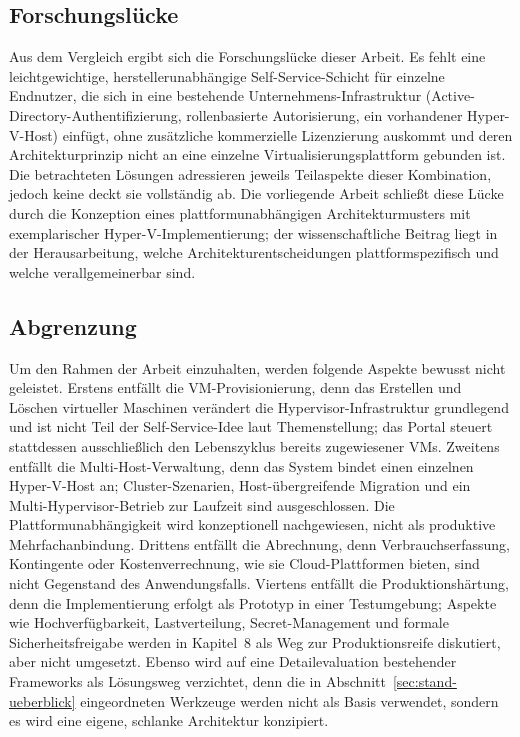 \documentclass[12pt,a4paper]{article}
\begin{document}
\subsection{Forschungslücke}

Aus dem Vergleich ergibt sich die Forschungslücke dieser Arbeit. Es fehlt eine leichtgewichtige, herstellerunabhängige Self-Service-Schicht für einzelne Endnutzer, die sich in eine bestehende Unternehmens-Infrastruktur (Active-Directory-Authentifizierung, rollenbasierte Autorisierung, ein vorhandener Hyper-V-Host) einfügt, ohne zusätzliche kommerzielle Lizenzierung auskommt und deren Architekturprinzip nicht an eine einzelne Virtualisierungsplattform gebunden ist. Die betrachteten Lösungen adressieren jeweils Teilaspekte dieser Kombination, jedoch keine deckt sie vollständig ab. Die vorliegende Arbeit schließt diese Lücke durch die Konzeption eines plattformunabhängigen Architekturmusters mit exemplarischer Hyper-V-Implementierung; der wissenschaftliche Beitrag liegt in der Herausarbeitung, welche Architekturentscheidungen plattformspezifisch und welche verallgemeinerbar sind.

\subsection{Abgrenzung}

Um den Rahmen der Arbeit einzuhalten, werden folgende Aspekte bewusst nicht geleistet. Erstens entfällt die VM-Provisionierung, denn das Erstellen und Löschen virtueller Maschinen verändert die Hypervisor-Infrastruktur grundlegend und ist nicht Teil der Self-Service-Idee laut Themenstellung; das Portal steuert stattdessen ausschließlich den Lebenszyklus bereits zugewiesener VMs. Zweitens entfällt die Multi-Host-Verwaltung, denn das System bindet einen einzelnen Hyper-V-Host an; Cluster-Szenarien, Host-übergreifende Migration und ein Multi-Hypervisor-Betrieb zur Laufzeit sind ausgeschlossen. Die Plattformunabhängigkeit wird konzeptionell nachgewiesen, nicht als produktive Mehrfachanbindung. Drittens entfällt die Abrechnung, denn Verbrauchserfassung, Kontingente oder Kostenverrechnung, wie sie Cloud-Plattformen bieten, sind nicht Gegenstand des Anwendungsfalls. Viertens entfällt die Produktionshärtung, denn die Implementierung erfolgt als Prototyp in einer Testumgebung; Aspekte wie Hochverfügbarkeit, Lastverteilung, Secret-Management und formale Sicherheitsfreigabe werden in Kapitel~8 als Weg zur Produktionsreife diskutiert, aber nicht umgesetzt. Ebenso wird auf eine Detailevaluation bestehender Frameworks als Lösungsweg verzichtet, denn die in Abschnitt~\ref{sec:stand-ueberblick} eingeordneten Werkzeuge werden nicht als Basis verwendet, sondern es wird eine eigene, schlanke Architektur konzipiert.
\end{document}
